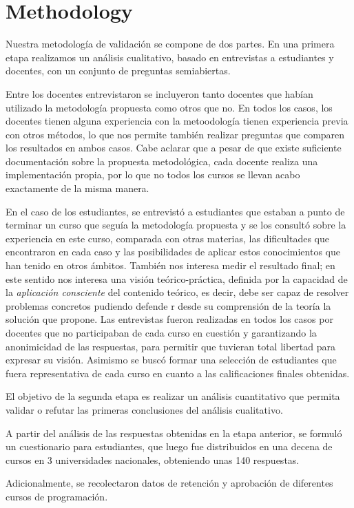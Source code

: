 \section{Methodology}
\label{sec:methodology}

Nuestra metodología de validación se compone de dos partes. 
En una primera etapa realizamos un análisis cualitativo, basado en entrevistas a estudiantes y docentes, con un conjunto de preguntas semiabiertas. 

Entre los docentes entrevistaron se incluyeron tanto docentes que habían utilizado la metodología propuesta como otros que no. En todos los casos, los docentes tienen alguna experiencia con la metoodología tienen experiencia previa con otros métodos, lo que nos permite también realizar preguntas que comparen los resultados en ambos casos.
Cabe aclarar que a pesar de que existe suficiente documentación sobre la propuesta metodológica, cada docente realiza una implementación propia, por lo que no todos los cursos se llevan acabo exactamente de la misma manera.

En el caso de los estudiantes, se entrevistó a estudiantes que estaban a punto de terminar un curso que seguía la metodología propuesta y se los consultó sobre la experiencia en este curso, comparada con otras materias, las dificultades que encontraron en cada caso y las posibilidades de aplicar estos conocimientos que han tenido en otros ámbitos. También nos interesa medir el resultado final; en este sentido nos interesa una visión teórico-práctica, definida por la capacidad de la \emph{aplicación consciente} del contenido teórico, es decir, debe ser capaz de resolver problemas concretos pudiendo defende                                          r desde su comprensión de la teoría la solución que propone.
Las entrevistas fueron realizadas en todos los casos por docentes que no participaban de cada curso en cuestión y garantizando la anonimicidad de las respuestas, para permitir que tuvieran total libertad para expresar su visión. Asimismo se buscó formar una selección de estudiantes que fuera representativa de cada curso en cuanto a las calificaciones finales obtenidas.

\medskip
El objetivo de la segunda etapa es realizar un análisis cuantitativo que permita validar o refutar las primeras conclusiones del análisis cualitativo.

A partir del análisis de las respuestas obtenidas en la etapa anterior, se formuló un cuestionario para estudiantes, que luego fue distribuidos en una decena de cursos en 3 universidades nacionales, obteniendo unas 140 respuestas.

Adicionalmente, se recolectaron datos de retención y aprobación de diferentes cursos de programación.


